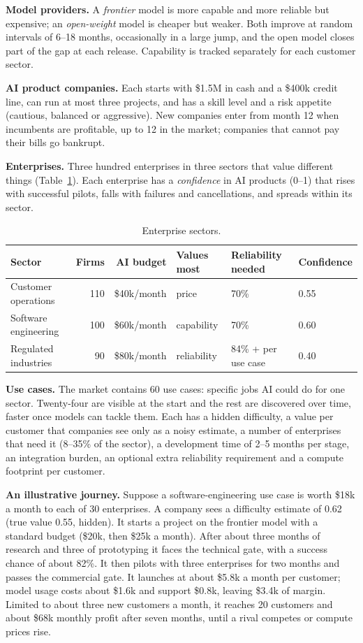 \documentclass[11pt]{article}
\begin{document}
\textbf{Model providers.} A \emph{frontier} model is more capable and more reliable but expensive; an \emph{open-weight} model is cheaper but weaker. Both improve at random intervals of 6--18 months, occasionally in a large jump, and the open model closes part of the gap at each release. Capability is tracked separately for each customer sector.

\textbf{AI product companies.} Each starts with \$1.5M in cash and a \$400k credit line, can run at most three projects, and has a skill level and a risk appetite (cautious, balanced or aggressive). New companies enter from month 12 when incumbents are profitable, up to 12 in the market; companies that cannot pay their bills go bankrupt.

\textbf{Enterprises.} Three hundred enterprises in three sectors that value different things (Table~\ref{tab:sectors}). Each enterprise has a \emph{confidence} in AI products (0--1) that rises with successful pilots, falls with failures and cancellations, and spreads within its sector.

\begin{table}[h]
\centering
\small\setlength{\tabcolsep}{4pt}
\begin{tabular}{lrrlll}
\toprule
Sector & Firms & AI budget & Values most & Reliability needed & Confidence \\
\midrule
Customer operations & 110 & \$40k/month & price & 70\% & 0.55 \\
Software engineering & 100 & \$60k/month & capability & 70\% & 0.60 \\
Regulated industries & 90 & \$80k/month & reliability & 84\% + per use case & 0.40 \\
\bottomrule
\end{tabular}
\caption{Enterprise sectors.}
\label{tab:sectors}
\end{table}

\textbf{Use cases.} The market contains 60 use cases: specific jobs AI could do for one sector. Twenty-four are visible at the start and the rest are discovered over time, faster once models can tackle them. Each has a hidden difficulty, a value per customer that companies see only as a noisy estimate, a number of enterprises that need it (8--35\% of the sector), a development time of 2--5 months per stage, an integration burden, an optional extra reliability requirement and a compute footprint per customer.

\textbf{An illustrative journey.} Suppose a software-engineering use case is worth \$18k a month to each of 30 enterprises. A company sees a difficulty estimate of 0.62 (true value 0.55, hidden). It starts a project on the frontier model with a standard budget (\$20k, then \$25k a month). After about three months of research and three of prototyping it faces the technical gate, with a success chance of about 82\%. It then pilots with three enterprises for two months and passes the commercial gate. It launches at about \$5.8k a month per customer; model usage costs about \$1.6k and support \$0.8k, leaving \$3.4k of margin. Limited to about three new customers a month, it reaches 20 customers and about \$68k monthly profit after seven months, until a rival competes or compute prices rise.
\end{document}
